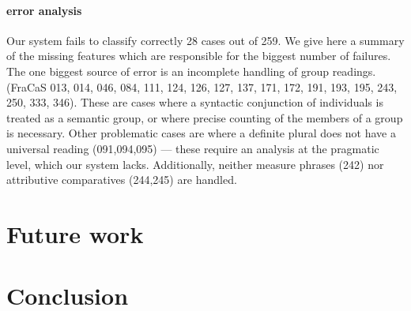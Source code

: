 \documentclass{article}
\begin{document}
\paragraph{error analysis}
Our system fails to classify correctly 28 cases out of 259.  We give
here a summary of the missing features which are responsible for the
biggest number of failures. The one biggest source of error is an
incomplete handling of group readings. (FraCaS
013, 014, 046, 084, 111, 124, 126, 127, 137, 171, 172, 191, 193, 195, 243, 250, 333, 346). These
are cases where a syntactic conjunction of individuals is treated as a
semantic group, or where precise counting of the members of a group is
necessary.  Other problematic cases are where a definite plural does
not have a universal reading (091,094,095) --- these require an
analysis at the pragmatic level, which our system lacks. Additionally,
neither measure phrases (242) nor attributive comparatives (244,245)
are handled.


\section{Future work}
\section{Conclusion}


\printbibliography
\end{document}
